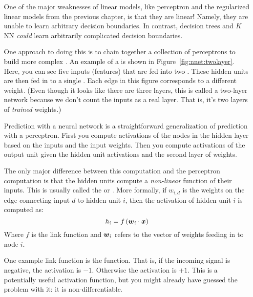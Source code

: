One of the major weaknesses of linear models, like perceptron and the
regularized linear models from the previous chapter, is that they are
linear!  Namely, they are unable to learn arbitrary decision
boundaries.  In contrast, decision trees and $K$NN \emph{could} learn
arbitrarily complicated decision boundaries.


One approach to doing this is to chain together a collection of
perceptrons to build more complex .  An
example of a  is shown in
Figure~\ref{fig:nnet:twolayer}.  Here, you can see five inputs
(features) that are fed into two .  These hidden
units are then fed in to a single .  Each edge in
this figure corresponds to a different weight.  (Even though it looks
like there are three layers, this is called a two-layer network
because we don't count the inputs as a real layer.  That is, it's two
layers of \emph{trained} weights.)

Prediction with a neural network is a straightforward generalization
of prediction with a perceptron.  First you compute activations of the
nodes in the hidden layer based on the inputs and the input weights.
Then you compute activations of the output unit given the hidden unit
activations and the second layer of weights.

The only major difference between this computation and the perceptron
computation is that the hidden units compute a \emph{non-linear}
function of their inputs.  This is usually called the
 or .  More
formally, if $w_{i,d}$ is the weights on the edge connecting input $d$
to hidden unit $i$, then the activation of hidden unit $i$ is computed
as:
%
\begin{equation}
  h_i = f\left( {\boldsymbol{w}}_i \cdot {\boldsymbol{x}} \right)
\end{equation}
%
Where $f$ is the link function and ${\boldsymbol{w}}_i$ refers to the
vector of weights feeding in to node $i$.

One example link function is the  function.  That is, if
the incoming signal is negative, the activation is $-1$.  Otherwise
the activation is $+1$.  This is a potentially useful activation
function, but you might already have guessed the problem with it: it
is non-differentiable.


